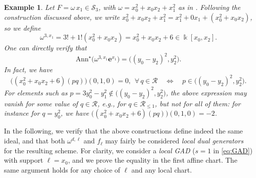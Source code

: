 \documentclass{amsart}
\theoremstyle{plain}
\newtheorem{example}[example]{Example}
\renewcommand{\k}{\Bbbk}
\renewcommand{\S}{\mathcal{S}}
\newcommand{\Ann}{\textnormal{Ann}}
\newcommand{\ideal}[1]{\mathopen{}\bigl( #1 \bigr)\mathclose{}}
\def\R{\mathcal{R}}
\def\Ann{\mathrm{Ann}}
\numberwithin{equation}{section}
\begin{document}
\begin{example} \label{ex:ex1-A-bis}
    Let $F = \omega\, x_1 \in \S_3$, with $\omega=x_0^2+x_0x_2+x_1^2$ as in .
    Following the construction discussed above, we write $x_0^2+x_0x_2+x_1^2 = x_1^2 + 0 x_1 + (x_0^2+x_0x_2)$, so we define
    \[ \omega^{3,x_1} = 3! + 1!(x_0^2+x_0x_2) = x_0^2 + x_0x_2 + 6 \in \k[x_0,x_2]. \]
    One can directly verify that%
    \[ \Ann^{\star}\big(\omega^{3,x_1} \mathbf{e}^{x_1} \big) = \ideal{ (y_0-y_2)^2,y_2^2 }. \]
    In fact, we have
    \[ \big( (x_0^2 + x_0x_2 + 6) ( pq ) \big) (0,1,0) = 0,  \ \ \forall \, q \in \R \quad \iff \quad p \in \ideal{ (y_0-y_2)^2,y_2^2 }. \]
    For elements such as $p = 3y_0^2-y_1^2 \notin \ideal{ (y_0-y_2)^2,y_2^2 }$, the above expression may vanish for some value of $q \in \R$, e.g., for $q \in \R_{\leq 1}$, but not for all of them: for instance for $q = y_0^2$, we have $\big( (x_0^2 + x_0 x_2 + 6) (pq) \big)(0,1,0) = -2$.
\end{example}

In the following, we verify that the above constructions define indeed the same ideal, and that both $\omega^{d,\ell}$ and $f_{\ell}$ may fairly be considered \emph{local dual generators} for the resulting scheme.
For clarity, we consider a \emph{local GAD} ($s=1$ in \cref{eq:GAD}) with support $\ell = x_0$, and we prove the equality in the first affine chart.
The same argument holds for any choice of $\ell$ and any local chart.
\end{document}
